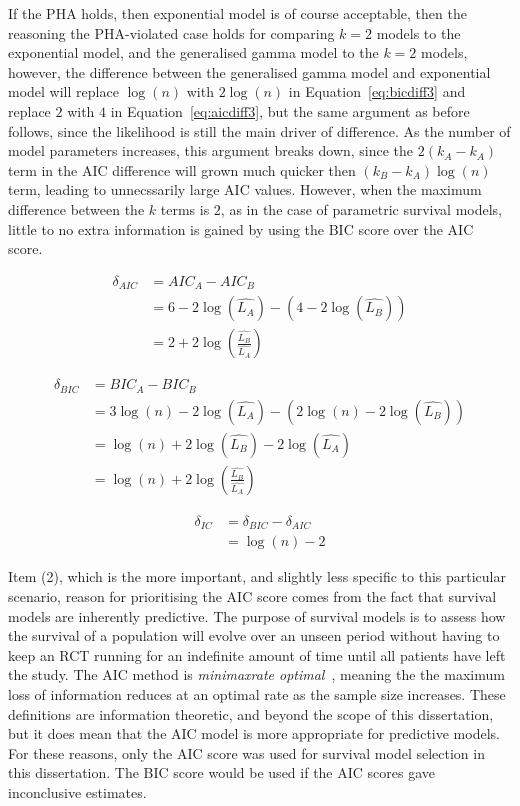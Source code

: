 If the PHA holds, then exponential model is of course acceptable, then the reasoning the PHA-violated case holds for comparing $k = 2$ models to the exponential model, and the generalised gamma model to the $k = 2$ models, however, the difference between the generalised gamma model and exponential model will replace $\log(n)$ with $2\log(n)$ in Equation~\ref{eq:bicdiff3} and replace $2$ with $4$ in Equation~\ref{eq:aicdiff3}, but the same argument as before follows, since the likelihood is still the main driver of difference. As the number of model parameters increases, this argument breaks down, since the $2(k_A - k_A)$ term in the AIC difference will grown much quicker then $(k_B-k_A)\log(n)$ term, leading to unnecssarily large AIC values. However, when the maximum difference between the $k$ terms is $2$, as in the case of parametric survival models, little to no extra information is gained by using the BIC score over the AIC score. 

\begin{align}
    \delta_{AIC} &= AIC_A - AIC_B \label{eq:aicdiff1}\\
           &= 6 - 2\log(\hat{L_A}) - (4 - 2\log(\hat{L_B})) \\
           &= 2 + 2\log\left(\frac{\hat{L_B}}{\hat{L_A}}\right) \label{eq:aicdiff3}
\end{align}

\begin{align}
    \delta_{BIC} &= BIC_A - BIC_B \label{eq:bicdiff1}\\
           &= 3\log(n) - 2\log(\hat{L_A}) - (2\log(n) - 2\log(\hat{L_B})) \\
           &= \log(n) + 2\log(\hat{L_B}) - 2\log(\hat{L_A}) \\
           &= \log(n) + 2\log\left(\frac{\hat{L_B}}{\hat{L_A}}\right) \label{eq:bicdiff3}
\end{align}

\begin{align}
    \delta_{IC} &= \delta_{BIC} - \delta_{AIC} \\
                &= \log(n) - 2 \label{eq:dicDiff}
\end{align}

Item (2), which is the more important, and slightly less specific to this particular scenario, reason for prioritising the AIC score comes from the fact that survival models are inherently predictive. The purpose of survival models is to assess how the survival of a population will evolve over an unseen period without having to keep an RCT running for an indefinite amount of time until all patients have left the study. The AIC method is \textit{minimax\-rate optimal}~\cite{ding}, meaning the the maximum loss of information reduces at an optimal rate as the sample size increases. These definitions are information theoretic, and beyond the scope of this dissertation, but it does mean that the AIC model is more appropriate for predictive models. \\

For these reasons, only the AIC score was used for survival model selection in this dissertation. The BIC score would be used if the AIC scores gave inconclusive estimates. 
